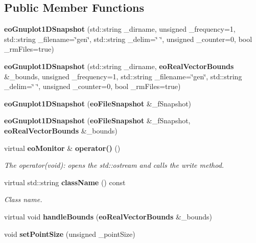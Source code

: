 \subsection*{Public Member Functions}
\begin{CompactItemize}
\item 
{\bf eo\-Gnuplot1DSnapshot} (std::string \_\-dirname, unsigned \_\-frequency=1, std::string \_\-filename=\char`\"{}gen\char`\"{}, std::string \_\-delim=\char`\"{} \char`\"{}, unsigned \_\-counter=0, bool \_\-rm\-Files=true)\label{classeo_gnuplot1_d_snapshot_a0}

\item 
{\bf eo\-Gnuplot1DSnapshot} (std::string \_\-dirname, {\bf eo\-Real\-Vector\-Bounds} \&\_\-bounds, unsigned \_\-frequency=1, std::string \_\-filename=\char`\"{}gen\char`\"{}, std::string \_\-delim=\char`\"{} \char`\"{}, unsigned \_\-counter=0, bool \_\-rm\-Files=true)\label{classeo_gnuplot1_d_snapshot_a1}

\item 
{\bf eo\-Gnuplot1DSnapshot} ({\bf eo\-File\-Snapshot} \&\_\-f\-Snapshot)\label{classeo_gnuplot1_d_snapshot_a2}

\item 
{\bf eo\-Gnuplot1DSnapshot} ({\bf eo\-File\-Snapshot} \&\_\-f\-Snapshot, {\bf eo\-Real\-Vector\-Bounds} \&\_\-bounds)\label{classeo_gnuplot1_d_snapshot_a3}

\item 
virtual {\bf eo\-Monitor} \& {\bf operator()} ()\label{classeo_gnuplot1_d_snapshot_a5}

\begin{CompactList}\small\item\em The operator(void): opens the std::ostream and calls the write method. \item\end{CompactList}\item 
virtual std::string {\bf class\-Name} () const \label{classeo_gnuplot1_d_snapshot_a6}

\begin{CompactList}\small\item\em Class name. \item\end{CompactList}\item 
virtual void {\bf handle\-Bounds} ({\bf eo\-Real\-Vector\-Bounds} \&\_\-bounds)\label{classeo_gnuplot1_d_snapshot_a7}

\item 
void {\bf set\-Point\-Size} (unsigned \_\-point\-Size)\label{classeo_gnuplot1_d_snapshot_a8}

\end{CompactItemize}
